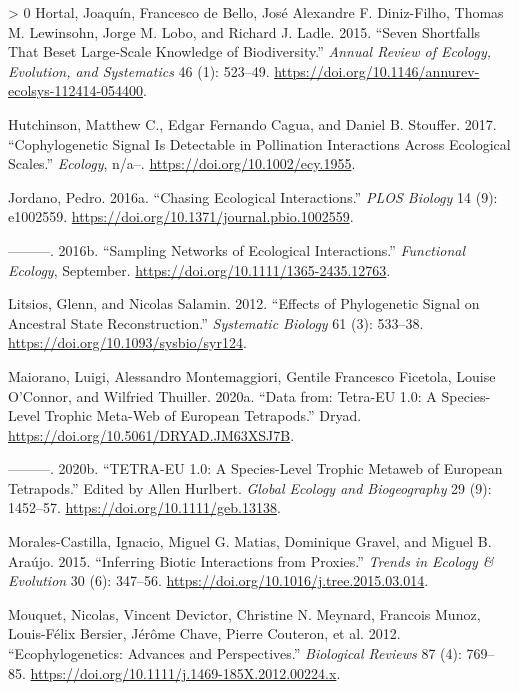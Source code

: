 \documentclass[10pt,oneside]{article}
\newlength{\cslhangindent}
\newenvironment{CSLReferences}[3] %
 {%
  \setlength{\parindent}{0pt}
  \ifodd #1 \everypar{\setlength{\hangindent}{\cslhangindent}}\ignorespaces\fi
  \ifnum #2 > 0
  \setlength{\parskip}{#2\baselineskip}
  \fi
 }%
 {}
\begin{document}
\begin{CSLReferences}{1}{0}
\leavevmode\hypertarget{ref-Hortal2015SevSho}{}%
Hortal, Joaquín, Francesco de Bello, José Alexandre F. Diniz-Filho,
Thomas M. Lewinsohn, Jorge M. Lobo, and Richard J. Ladle. 2015. {``Seven
Shortfalls That Beset Large-Scale Knowledge of Biodiversity.''}
\emph{Annual Review of Ecology, Evolution, and Systematics} 46 (1):
523--49. \url{https://doi.org/10.1146/annurev-ecolsys-112414-054400}.

\leavevmode\hypertarget{ref-Hutchinson2017CopSig}{}%
Hutchinson, Matthew C., Edgar Fernando Cagua, and Daniel B. Stouffer.
2017. {``Cophylogenetic Signal Is Detectable in Pollination Interactions
Across Ecological Scales.''} \emph{Ecology}, n/a--.
\url{https://doi.org/10.1002/ecy.1955}.

\leavevmode\hypertarget{ref-Jordano2016ChaEcoa}{}%
Jordano, Pedro. 2016a. {``Chasing Ecological Interactions.''} \emph{PLOS
Biology} 14 (9): e1002559.
\url{https://doi.org/10.1371/journal.pbio.1002559}.

\leavevmode\hypertarget{ref-Jordano2016SamNeta}{}%
---------. 2016b. {``Sampling Networks of Ecological Interactions.''}
\emph{Functional Ecology}, September.
\url{https://doi.org/10.1111/1365-2435.12763}.

\leavevmode\hypertarget{ref-Litsios2012EffPhy}{}%
Litsios, Glenn, and Nicolas Salamin. 2012. {``Effects of Phylogenetic
Signal on Ancestral State Reconstruction.''} \emph{Systematic Biology}
61 (3): 533--38. \url{https://doi.org/10.1093/sysbio/syr124}.

\leavevmode\hypertarget{ref-Maiorano2020DatTet}{}%
Maiorano, Luigi, Alessandro Montemaggiori, Gentile Francesco Ficetola,
Louise O'Connor, and Wilfried Thuiller. 2020a. {``Data from: Tetra-EU
1.0: A Species-Level Trophic Meta-Web of European Tetrapods.''} Dryad.
\url{https://doi.org/10.5061/DRYAD.JM63XSJ7B}.

\leavevmode\hypertarget{ref-Maiorano2020TetEu}{}%
---------. 2020b. {``TETRA-EU 1.0: A Species-Level Trophic Metaweb of
European Tetrapods.''} Edited by Allen Hurlbert. \emph{Global Ecology
and Biogeography} 29 (9): 1452--57.
\url{https://doi.org/10.1111/geb.13138}.

\leavevmode\hypertarget{ref-Morales-Castilla2015InfBioa}{}%
Morales-Castilla, Ignacio, Miguel G. Matias, Dominique Gravel, and
Miguel B. Araújo. 2015. {``Inferring Biotic Interactions from
Proxies.''} \emph{Trends in Ecology \& Evolution} 30 (6): 347--56.
\url{https://doi.org/10.1016/j.tree.2015.03.014}.

\leavevmode\hypertarget{ref-Mouquet2012EcoAdv}{}%
Mouquet, Nicolas, Vincent Devictor, Christine N. Meynard, Francois
Munoz, Louis-Félix Bersier, Jérôme Chave, Pierre Couteron, et al. 2012.
{``Ecophylogenetics: Advances and Perspectives.''} \emph{Biological
Reviews} 87 (4): 769--85.
\url{https://doi.org/10.1111/j.1469-185X.2012.00224.x}.


\end{CSLReferences}
\end{document}
